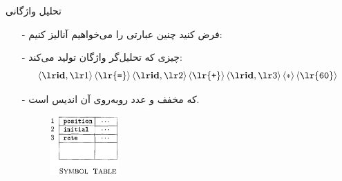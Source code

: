 \begin{frame}{تحلیل واژگانی }
\begin{itemize}\itemr
\item[-]
فرض کنید چنین عبارتی را می‌خواهیم آنالیز کنیم:

\begin{flushleft}
\end{flushleft}
\item[-]
چیزی که تحلیل‌گر واژگان تولید می‌کند:
\begin{equation*}
\token{1} 
\left\langle\text{\lr{\texttt{=}}}\right\rangle
\token{2}
\left\langle\text{\lr{\texttt{+}}}\right\rangle
\token{3}
\left\langle\ast\right\rangle
\left\langle\text{\lr{\texttt{60}}}\right\rangle
\end{equation*}

\item[-]
که 
مخفف 
و عدد روبه‌روی آن اندیس 
است.
\begin{figure}[H]
\begin{center}
\includegraphics[width=0.25\textwidth, height=0.3\textheight]{docs/images/symboltable}
\end{center}
\end{figure}
\end{itemize}
\end{frame}
